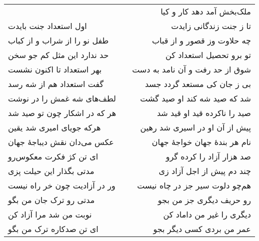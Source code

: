 \begin{center}
\begin{longtable}{l p{0.5cm} r}
&&
ملک‌بخش آمد دهد کار و کیا
\\
اول استعداد جنت بایدت
&&
تا ز جنت زندگانی زایدت
\\
طفل نو را از شراب و از کباب
&&
چه حلاوت وز قصور و از قباب
\\
حد ندارد این مثل کم جو سخن
&&
تو برو تحصیل استعداد کن
\\
بهر استعداد تا اکنون نشست
&&
شوق از حد رفت و آن نامد به دست
\\
گفت استعداد هم از شه رسد
&&
بی ز جان کی مستعد گردد جسد
\\
لطف‌های شه غمش را در نوشت
&&
شد که صید شه کند او صید گشت
\\
هر که در اشکار چون تو صید شد
&&
صید را ناکرده قید او قید شد
\\
هرکه جویای امیری شد یقین
&&
پیش از آن او در اسیری شد رهین
\\
عکس می‌دان نقش دیباجهٔ جهان
&&
نام هر بندهٔ جهان خواجهٔ جهان
\\
ای تن کژ فکرت معکوس‌رو
&&
صد هزار آزاد را کرده گرو
\\
مدتی بگذار این حیلت پزی
&&
چند دم پیش از اجل آزاد زی
\\
ور در آزادیت چون خر راه نیست
&&
هم‌چو دلوت سیر جز در چاه نیست
\\
مدتی رو ترک جان من بگو
&&
رو حریف دیگری جز من بجو
\\
نوبت من شد مرا آزاد کن
&&
دیگری را غیر من داماد کن
\\
ای تن صدکاره ترک من بگو
&&
عمر من بردی کسی دیگر بجو
\\
\end{longtable}
\end{center}
